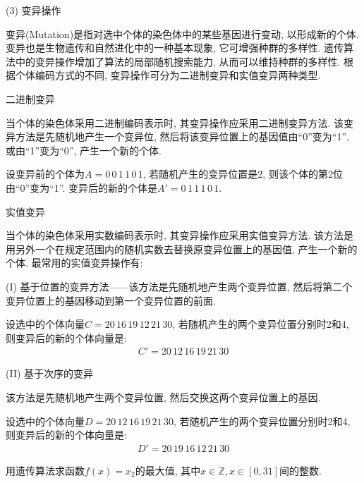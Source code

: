 (3) 变异操作

 变异(Mutation)是指对选中个体的染色体中的某些基因进行变动, 以形成新的个体. 变异也是生物遗传和自然进化中的一种基本现象, 它可增强种群的多样性. 遗传算法中的变异操作增加了算法的局部随机搜索能力, 从而可以维持种群的多样性. 根据个体编码方式的不同, 变异操作可分为二进制变异和实值变异两种类型.

  二进制变异

 当个体的染色体采用二进制编码表示时, 其变异操作应采用二进制变异方法. 该变异方法是先随机地产生一个变异位, 然后将该变异位置上的基因值由“0”变为“1”, 或由“1”变为“0”, 产生一个新的个体.

\begin{example}
设变异前的个体为$A=0\, 0 \, 1\,  1\,  0 \, 1$, 若随机产生的变异位置是2, 则该个体的第2位由“0”变为“1”.
变异后的新的个体是$A'= 0\,  1\,  1\,  1\,  0 \, 1$.
\end{example}

 实值变异

 当个体的染色体采用实数编码表示时, 其变异操作应采用实值变异方法. 该方法是用另外一个在规定范围内的随机实数去替换原变异位置上的基因值, 产生一个新的个体. 最常用的实值变异操作有:

(I) 基于位置的变异方法——该方法是先随机地产生两个变异位置, 然后将第二个变异位置上的基因移动到第一个变异位置的前面.

\begin{example}
设选中的个体向量$C=20\,  16\,  19\,  12\,  21\,  30$, 若随机产生的两个变异位置分别时2和4, 则变异后的新的个体向量是:
\begin{align}
    C'= 20\,  12 \, 16 \, 19\,  21\,  30
\end{align}
\end{example}

(II) 基于次序的变异

该方法是先随机地产生两个变异位置, 然后交换这两个变异位置上的基因.

\begin{example}
    设选中的个体向量$D=20\,  12 \, 16 \, 19\,  21\,  30$, 若随机产生的两个变异位置分别时2和4, 则变异后的新的个体向量是:
\begin{align}
    D'= 20\,  19\,  16\,  12 \, 21 \, 30
\end{align}
\end{example}

\begin{example}
    用遗传算法求函数$f(x)=x_2$的最大值, 其中$x\in \mathbb Z, x\in [0,31]$间的整数.
\end{example}


